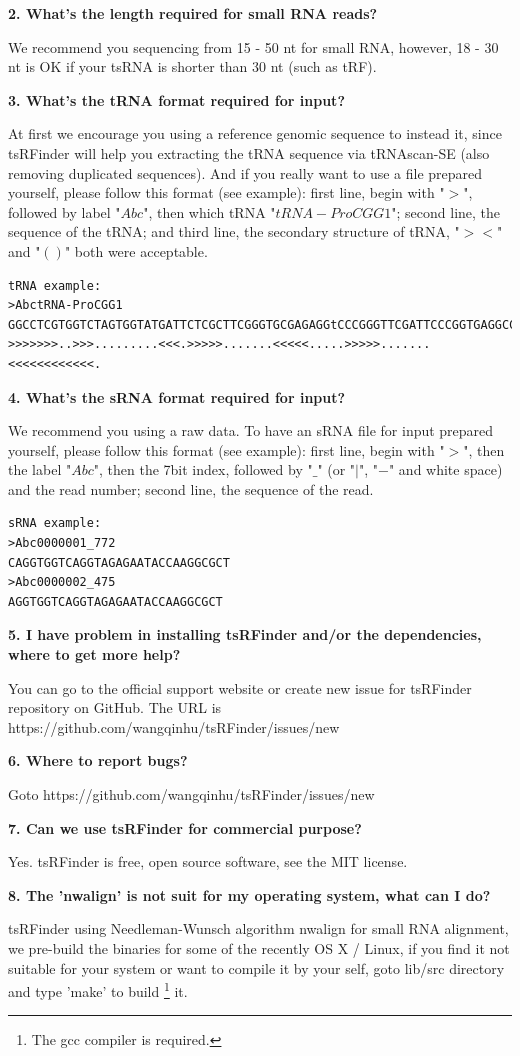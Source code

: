 \documentclass[11pt, a4paper]{article}
\begin{document}
\textbf{2. What's the length required for small RNA reads?}

We recommend you sequencing from 15 - 50 nt for small RNA, however, 18 - 30 nt is OK if your tsRNA is shorter than 30 nt (such as tRF).

\textbf{3. What's the tRNA format required for input?}

At first we encourage you using a reference genomic sequence to instead it, since tsRFinder will help you extracting the tRNA sequence via tRNAscan-SE (also removing duplicated sequences). And if you really want to use a file prepared yourself, please follow this format (see example): first line, begin with "$>$", followed by label "$Abc$", then which tRNA "$tRNA-ProCGG1$";  second line, the sequence of the tRNA; and third line, the secondary structure of tRNA, "$><$" and "$()$" both were acceptable.

{\scriptsize \begin{verbatim}
tRNA example:
>AbctRNA-ProCGG1
GGCCTCGTGGTCTAGTGGTATGATTCTCGCTTCGGGTGCGAGAGGtCCCGGGTTCGATTCCCGGTGAGGCCC
>>>>>>>..>>>.........<<<.>>>>>.......<<<<<.....>>>>>.......<<<<<<<<<<<<.
\end{verbatim}}

\textbf{4. What's the sRNA format required for input?}

We recommend you using a raw data. To have an sRNA file for input prepared yourself, please follow this format (see example): first line, begin with "$>$", then the label "$Abc$", then the 7\-bit index, followed by "$\_$" (or "$|$", "$-$" and white space) and the read number; second line, the sequence of the read.

{\scriptsize \begin{verbatim}
sRNA example:
>Abc0000001_772
CAGGTGGTCAGGTAGAGAATACCAAGGCGCT
>Abc0000002_475
AGGTGGTCAGGTAGAGAATACCAAGGCGCT
\end{verbatim}}


\textbf{5. I have problem in installing tsRFinder and/or the dependencies, where to get more help?}

You can go to the official support website or create new issue for tsRFinder repository on GitHub. The URL is https://github.com/wangqinhu/tsRFinder/issues/new

\textbf{6. Where to report bugs?}

Goto https://github.com/wangqinhu/tsRFinder/issues/new

\textbf{7. Can we use tsRFinder for commercial purpose?}

Yes. tsRFinder is free, open source software, see the MIT license.

\textbf{8. The 'nwalign' is not suit for my operating system, what can I do?}

tsRFinder using Needleman-Wunsch algorithm nwalign for small RNA alignment, we pre-build the binaries for some of the recently OS X / Linux, if you find it not suitable for your system or want to compile it by your self, goto lib/src directory and type 'make' to build \footnote{The gcc compiler is required.} it.
\end{document}
